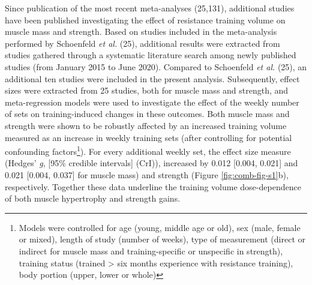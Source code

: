 \documentclass[twoside,10pt]{gihclass} %
\begin{document}
Since publication of the most recent meta-analyses (25,131),
additional studies have been published investigating the effect of resistance training volume on muscle mass and strength. Based on studies included in the meta-analysis performed by Schoenfeld \emph{et al.} (25), additional results were extracted from studies gathered through a systematic literature search among newly published studies (from January 2015 to June 2020). Compared to Schoenfeld \emph{et al.} (25), an additional ten studies were included in the present analysis.
Subsequently, effect sizes were extracted from 25 studies, both for muscle mass and strength, and meta-regression models were used to investigate the effect of the weekly number of sets on training-induced changes in these outcomes.
Both muscle mass and strength were shown to be robustly affected by an increased training volume measured as an increase in weekly training sets (after controlling for potential confounding factors\footnote{Models were controlled for age (young, middle age or old), sex (male, female or mixed), length of study (number of weeks), type of measurement (direct or indirect for muscle mass and training-specific or unspecific in strength), training status (trained \textgreater{} six months experience with resistance training), body portion (upper, lower or whole)}).
For every additional weekly set, the effect size measure (Hedges' \emph{g}, {[}95\% credible intervals{]} (CrI)), increased by
0.012 {[}0.004, 0.021{]} and 0.021 {[}0.004, 0.037{]}
for muscle mass)
and strength (Figure \ref{fig:comb-fig-s1}b),
respectively.
Together these data underline the training volume dose-dependence of both muscle hypertrophy and strength gains.
\end{document}
